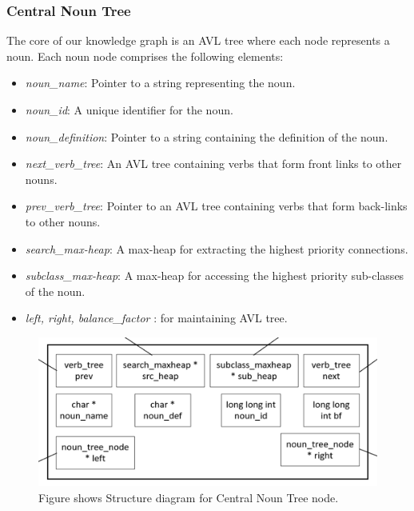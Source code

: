 \documentclass[conference]{IEEEtran}
\begin{document}
\subsubsection{Central Noun Tree}
The core of our knowledge graph is an AVL tree where each node represents a noun. Each noun node comprises the following elements:
\begin{itemize}

    \item \textit{noun\_name}: Pointer to a string representing the noun.
    \item \textit{noun\_id}: A unique identifier for the noun.
    \item \textit{noun\_definition}: Pointer to a string containing the definition of the noun.
    \item \textit{next\_verb\_tree}: An AVL tree containing verbs that form front links to other nouns.
    \item \textit{prev\_verb\_tree}: Pointer to an AVL tree containing verbs that form back-links to other nouns.
    \item \textit{search\_max-heap}: A max-heap for extracting the highest priority connections.
    \item \textit{subclass\_max-heap}: A max-heap for accessing the highest priority sub-classes of the noun.
    \item \textit{left, right, balance\_factor} : for maintaining AVL tree. 
    
\end{itemize}


\begin{figure}[htbp]
\centering
\includegraphics[width=0.8\linewidth]{fig_2_2.png} %
\caption{Figure shows Structure diagram for Central Noun Tree node.}
\label{fig}
\end{figure}
\end{document}
